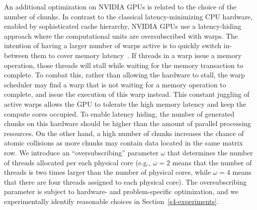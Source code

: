 An additional optimization on NVIDIA GPUs is related to the choice of the
number of chunks.
In contrast to the classical latency-minimizing CPU hardware, enabled by
sophisticated cache hierarchy, NVIDIA GPUs use a latency-hiding approach
where the 
computational units are oversubscribed with warps.
The intention of having a larger number of warps active
is to quickly switch in-between them to cover memory latency~\cite{lawn2016}. 
If threads in a warp issue a memory operation, those threads will stall while waiting for the
memory transaction to complete. To combat this, rather than
allowing the hardware to stall, the warp scheduler may find a
warp that is not waiting for a memory operation to complete,
and issue the execution of this warp instead. This constant juggling
of active warps allows the GPU to tolerate the high memory
latency and keep the compute cores occupied.
To enable latency hiding, the number of generated chunks on this hardware
should be higher than the amount of parallel processing resources.
On the other hand, a high number of chunks increases the chance of atomic
collisions as more chunks may contain data located in the same matrix row.
We introduce an ``oversubscribing'' parameter $\omega$ that
determines the number of threads 
allocated per each physical core
(e.g., $\omega = 2$ means that the number of threads is two times larger 
than the number of physical cores, while $\omega = 4$ 
means that there are four threads assigned to each physical core).
The oversubscribing parameter is subject to hardware- and problem-specific optimization,
and we experimentally identify reasonable choices in Section~\ref{s4-experiments}.

